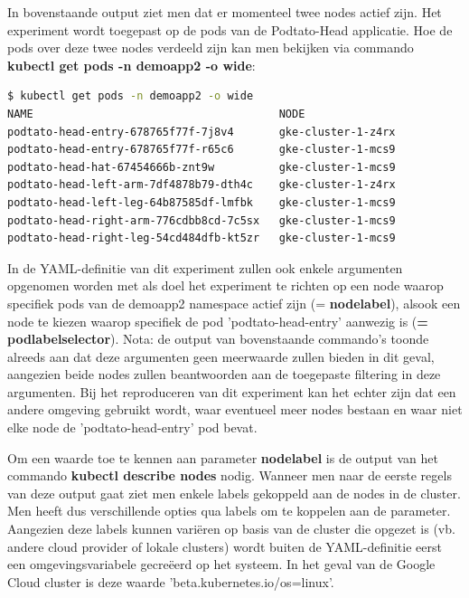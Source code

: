 In bovenstaande output ziet men dat er momenteel twee nodes actief zijn. Het experiment wordt toegepast op de pods van de Podtato-Head applicatie. Hoe de pods over deze twee nodes verdeeld zijn kan men bekijken via commando {\bf kubectl get pods -n demoapp2 -o wide}:
\begin{lstlisting}[language=bash]
$ kubectl get pods -n demoapp2 -o wide
NAME                                      NODE                                       
podtato-head-entry-678765f77f-7j8v4       gke-cluster-1-z4rx
podtato-head-entry-678765f77f-r65c6       gke-cluster-1-mcs9
podtato-head-hat-67454666b-znt9w          gke-cluster-1-mcs9
podtato-head-left-arm-7df4878b79-dth4c    gke-cluster-1-z4rx
podtato-head-left-leg-64b87585df-lmfbk    gke-cluster-1-mcs9
podtato-head-right-arm-776cdbb8cd-7c5sx   gke-cluster-1-mcs9
podtato-head-right-leg-54cd484dfb-kt5zr   gke-cluster-1-mcs9
\end{lstlisting} 
 
In de YAML-definitie van dit experiment zullen ook enkele argumenten opgenomen worden met als doel het experiment te richten op een node waarop specifiek pods van de demoapp2 namespace actief zijn (= {\bf node\textunderscore label}), alsook een node te kiezen waarop specifiek de pod 'podtato-head-entry' aanwezig is ({\bf = pod\textunderscore label\textunderscore selector}). \newline Nota: de output van bovenstaande commando's toonde alreeds aan dat deze argumenten geen meerwaarde zullen bieden in dit geval, aangezien beide nodes zullen beantwoorden aan de toegepaste filtering in deze argumenten.
Bij het reproduceren van dit experiment kan het echter zijn dat een andere omgeving gebruikt wordt, waar eventueel meer nodes bestaan en waar niet elke node de 'podtato-head-entry' pod bevat.

Om een waarde toe te kennen aan parameter {\bf node\textunderscore label} is de output van het commando {\bf kubectl describe nodes} nodig. Wanneer men naar de eerste regels van deze output gaat ziet men enkele labels gekoppeld aan de nodes in de cluster. Men heeft dus verschillende opties qua labels om te koppelen aan de parameter. Aangezien deze labels kunnen variëren op basis van de cluster die opgezet is (vb. andere cloud provider of lokale clusters) wordt buiten de YAML-definitie eerst een omgevingsvariabele gecreëerd op het systeem.
\newline In het geval van de Google Cloud cluster is deze waarde 'beta.kubernetes.io/os=linux'. 

